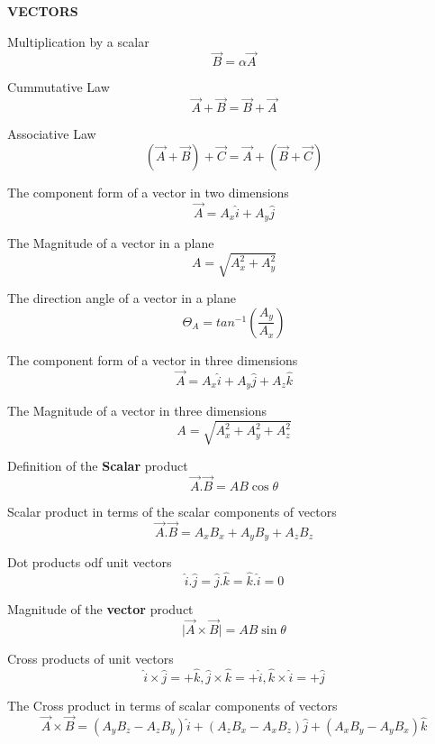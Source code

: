 \documentclass[12pt, letterpaper, twoside]{article}
\begin{document}
\vfil


\textbf{VECTORS}
$$  $$

Multiplication by a scalar
$$\overrightarrow{B}=\alpha \overrightarrow{A}$$


Cummutative Law
$$\overrightarrow{A} +\overrightarrow{B} = \overrightarrow{B} + \overrightarrow{A}$$ 


Associative Law
$$(\overrightarrow{A} + \overrightarrow{B}) + \overrightarrow{C} = \overrightarrow{A} + (\overrightarrow{B} + \overrightarrow{C})$$



The component form of a vector in two dimensions
$$\overrightarrow{A} = A_x \hat{i} + A_y \hat{j}$$




The Magnitude of a vector in a plane
$$A = \sqrt{A_x^2 + A_y^2}$$



The direction angle of a vector in a plane
$$\Theta_A = tan^{-1} \left( \frac{A_y}{A_x} \right)$$




The component form of a vector in three dimensions
$$\overrightarrow{A} = A_x \hat{i} + A_y \hat{j} + A_z \hat{k}$$


The Magnitude of a vector in three dimensions
$$A = \sqrt{A_x^2 + A_y^2 + A_z^2}$$



Definition of the \textbf{Scalar} product
$$\overrightarrow{A} . \overrightarrow{B}= AB \cos \theta$$


Scalar product in terms of the scalar components of vectors
$$\overrightarrow{A} . \overrightarrow{B}= A_x B_x + A_y B_y + A_z B_z$$



Dot products odf unit vectors
$$\hat{i} . \hat{j} = \hat{j} . \hat{k} = \hat{k} . \hat{i} = 0$$



Magnitude of the \textbf{vector} product
$$\mid \overrightarrow{A} \times \overrightarrow{B} \mid= AB \sin \theta$$



Cross products of unit vectors
$$\hat{i} \times \hat{j} =+ \hat{k}, \hat{j} \times \hat{k} = +\hat{i}, \hat{k} \times \hat{i} =+ \hat{j}$$
 



The Cross product in terms of scalar components of vectors
$$\overrightarrow{A} \times \overrightarrow{B} = (A_y B_z - A_z B_y) \hat{i} + (A_z B_x - A_x B_z) \hat{j} + (A_x B_y - A_y B_x) \hat{k}$$
\end{document}
